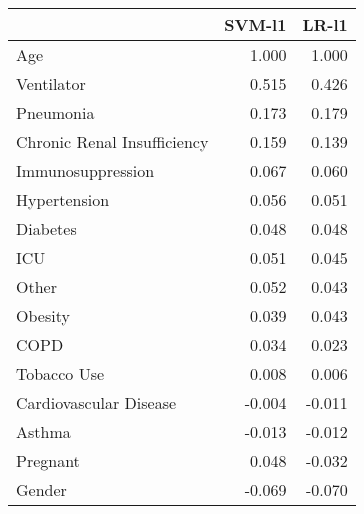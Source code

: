 \begin{tabular}{lrr}
\toprule
{} &  SVM-l1 &  LR-l1 \\
\midrule
Age                         &   1.000 &  1.000 \\
Ventilator                  &   0.515 &  0.426 \\
Pneumonia                   &   0.173 &  0.179 \\
Chronic Renal Insufficiency &   0.159 &  0.139 \\
Immunosuppression           &   0.067 &  0.060 \\
Hypertension                &   0.056 &  0.051 \\
Diabetes                    &   0.048 &  0.048 \\
ICU                         &   0.051 &  0.045 \\
Other                       &   0.052 &  0.043 \\
Obesity                     &   0.039 &  0.043 \\
COPD                        &   0.034 &  0.023 \\
Tobacco Use                 &   0.008 &  0.006 \\
Cardiovascular Disease      &  -0.004 & -0.011 \\
Asthma                      &  -0.013 & -0.012 \\
Pregnant                    &   0.048 & -0.032 \\
Gender                      &  -0.069 & -0.070 \\
\bottomrule
\end{tabular}

